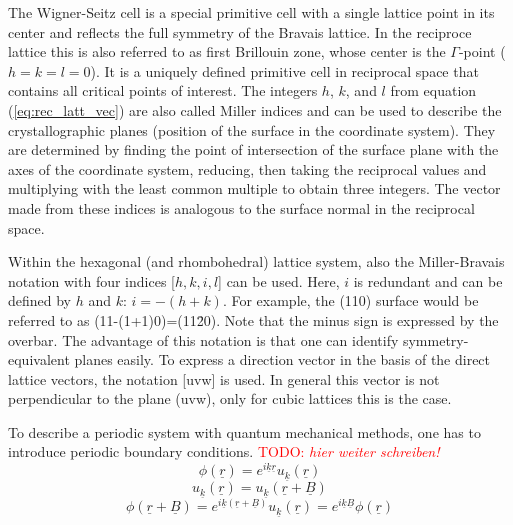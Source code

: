 \documentclass[11pt,DIV=13,BCOR=5mm,a4paper,headinclude]{scrbook}
\newcommand\todo[1]{\textcolor{red}{TODO: \textit{{#1}}}}
\renewcommand{\vec}[1]{\underline{#1}}
\begin{document}
The Wigner-Seitz cell is a special primitive cell with a single lattice point in its center and reflects the full symmetry of the Bravais lattice.
In the reciproce lattice this is also referred to as first Brillouin zone, whose center is the $\Gamma$-point ($h=k=l=0$).
It is a uniquely defined primitive cell in reciprocal space that contains all critical points of interest.
The integers $h$, $k$, and $l$ from equation (\ref{eq:rec_latt_vec}) are also called Miller indices and can be used to describe the crystallographic planes (position of the surface in the coordinate system).
They are determined by finding the point of intersection of the surface plane with the axes of the coordinate system, reducing, then taking the reciprocal values and multiplying with the least common multiple to obtain three integers.
The vector made from these indices is analogous to the surface normal in the reciprocal space.


Within the hexagonal (and rhombohedral) lattice system, also the Miller-Bravais notation with four indices [$h,k,i,l$] can be used.
Here, $i$ is redundant and can be defined by $h$ and $k$: $i=-(h+k)$.
For example, the (110) surface would be referred to as (11-(1+1)0)=(11\=20).
Note that the minus sign is expressed by the overbar.
The advantage of this notation is that one can identify symmetry-equivalent planes easily.
To express a direction vector in the basis of the direct lattice vectors, the notation [uvw] is used.
In general this vector is not perpendicular to the plane (uvw), only for cubic lattices this is the case.


To describe a periodic system with quantum mechanical methods, one has to introduce periodic boundary conditions.
\todo{hier weiter schreiben!}
\begin{equation}
\phi(\vec{r})=e^{i\vec{k}\vec{r}}u_{\vec{k}}(\vec{r})
\end{equation}
\begin{equation}
u_{\vec{k}}(\vec{r})=u_{\vec{k}}(\vec{r}+\vec{B})
\end{equation}
\begin{equation}
\phi(\vec{r}+\vec{B})=e^{i\vec{k}(\vec{r}+\vec{B})}u_{\vec{k}}(\vec{r})=e^{i\vec{k}\vec{B}}\phi(\vec{r})
\end{equation}
\end{document}
